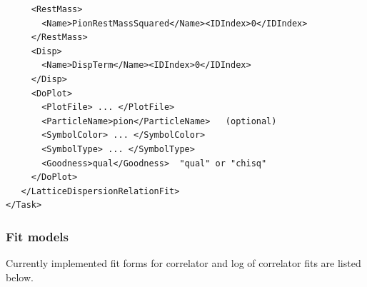 \documentclass[12pt]{article}
\begin{document}
\begin{verbatim}
     <RestMass>                                                          
       <Name>PionRestMassSquared</Name><IDIndex>0</IDIndex>              
     </RestMass>                                                         
     <Disp>                                                              
       <Name>DispTerm</Name><IDIndex>0</IDIndex>                         
     </Disp>                                                             
     <DoPlot>                                                            
       <PlotFile> ... </PlotFile>                                        
       <ParticleName>pion</ParticleName>   (optional)                    
       <SymbolColor> ... </SymbolColor>                                  
       <SymbolType> ... </SymbolType>                                    
       <Goodness>qual</Goodness>  "qual" or "chisq"                      
     </DoPlot>                                                           
   </LatticeDispersionRelationFit>                                       
</Task>                                                                  
\end{verbatim}

\subsubsection{Fit models} \label{sec:models}
Currently implemented fit forms for correlator and log of correlator
fits are listed below.
\end{document}

